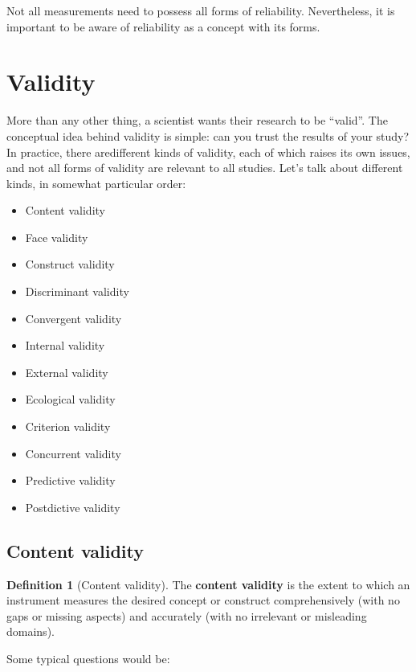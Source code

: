 \documentclass[
  11pt,
]{book}
\providecommand{\tightlist}{%
  \setlength{\itemsep}{0pt}\setlength{\parskip}{0pt}}
\theoremstyle{definition}
\newtheorem{definition}{Definition}[chapter]
\theoremstyle{definition}
\theoremstyle{definition}
\theoremstyle{definition}
\theoremstyle{remark}
\begin{document}
Not all measurements need to possess all forms of reliability. Nevertheless, it is important to be aware of reliability as a concept with its forms.

\hypertarget{validity}{%
\section{Validity}\label{validity}}

More than any other thing, a scientist wants their research to be ``valid''. The conceptual idea behind validity is simple: can you trust the results of your study? In practice, there aredifferent kinds of validity, each of which raises its own issues, and not all forms of validity are relevant to all studies. Let's talk about different kinds, in somewhat particular order:

\begin{itemize}
\tightlist
\item
  Content validity
\item
  Face validity
\item
  Construct validity
\item
  Discriminant validity
\item
  Convergent validity
\item
  Internal validity
\item
  External validity
\item
  Ecological validity
\item
  Criterion validity
\item
  Concurrent validity
\item
  Predictive validity
\item
  Postdictive validity
\end{itemize}

\hypertarget{content-validity}{%
\subsection{Content validity}\label{content-validity}}

\begin{definition}[Content validity]
\protect\hypertarget{def:defcontentvalidity}{}\label{def:defcontentvalidity}The \textbf{content validity} is the extent to which an instrument measures the desired concept or construct comprehensively (with no gaps or missing aspects) and accurately (with no irrelevant or misleading domains).
\end{definition}

Some typical questions would be:
\end{document}
